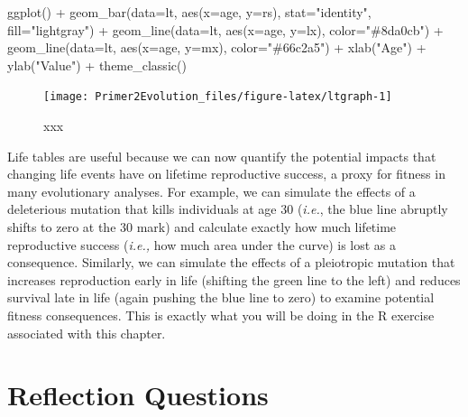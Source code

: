 \documentclass[
]{book}
\newenvironment{Shaded}{\begin{snugshade}}{\end{snugshade}}
\newcommand{\AttributeTok}[1]{\textcolor[rgb]{0.77,0.63,0.00}{#1}}
\newcommand{\FunctionTok}[1]{\textcolor[rgb]{0.00,0.00,0.00}{#1}}
\newcommand{\NormalTok}[1]{#1}
\newcommand{\SpecialCharTok}[1]{\textcolor[rgb]{0.00,0.00,0.00}{#1}}
\newcommand{\StringTok}[1]{\textcolor[rgb]{0.31,0.60,0.02}{#1}}
\begin{document}
\begin{Shaded}
\begin{Highlighting}[]
\FunctionTok{ggplot}\NormalTok{() }\SpecialCharTok{+}
    \FunctionTok{geom\_bar}\NormalTok{(}\AttributeTok{data=}\NormalTok{lt, }\FunctionTok{aes}\NormalTok{(}\AttributeTok{x=}\NormalTok{age, }\AttributeTok{y=}\NormalTok{rs), }\AttributeTok{stat=}\StringTok{"identity"}\NormalTok{, }\AttributeTok{fill=}\StringTok{"lightgray"}\NormalTok{) }\SpecialCharTok{+}
    \FunctionTok{geom\_line}\NormalTok{(}\AttributeTok{data=}\NormalTok{lt, }\FunctionTok{aes}\NormalTok{(}\AttributeTok{x=}\NormalTok{age, }\AttributeTok{y=}\NormalTok{lx), }\AttributeTok{color=}\StringTok{"\#8da0cb"}\NormalTok{) }\SpecialCharTok{+}
    \FunctionTok{geom\_line}\NormalTok{(}\AttributeTok{data=}\NormalTok{lt, }\FunctionTok{aes}\NormalTok{(}\AttributeTok{x=}\NormalTok{age, }\AttributeTok{y=}\NormalTok{mx), }\AttributeTok{color=}\StringTok{"\#66c2a5"}\NormalTok{) }\SpecialCharTok{+}
    \FunctionTok{xlab}\NormalTok{(}\StringTok{"Age"}\NormalTok{) }\SpecialCharTok{+}
    \FunctionTok{ylab}\NormalTok{(}\StringTok{"Value"}\NormalTok{) }\SpecialCharTok{+}
    \FunctionTok{theme\_classic}\NormalTok{()}
\end{Highlighting}
\end{Shaded}

\begin{figure}
\texttt{[image: Primer2Evolution\_files/figure-latex/ltgraph-1]} \caption{xxx}\label{fig:ltgraph}
\end{figure}

Life tables are useful because we can now quantify the potential impacts that changing life events have on lifetime reproductive success, a proxy for fitness in many evolutionary analyses. For example, we can simulate the effects of a deleterious mutation that kills individuals at age 30 (\emph{i.e.}, the blue line abruptly shifts to zero at the 30 mark) and calculate exactly how much lifetime reproductive success (\emph{i.e.,} how much area under the curve) is lost as a consequence. Similarly, we can simulate the effects of a pleiotropic mutation that increases reproduction early in life (shifting the green line to the left) and reduces survival late in life (again pushing the blue line to zero) to examine potential fitness consequences. This is exactly what you will be doing in the R exercise associated with this chapter.

\hypertarget{reflection-questions-11}{%
\section{Reflection Questions}\label{reflection-questions-11}}
\end{document}
